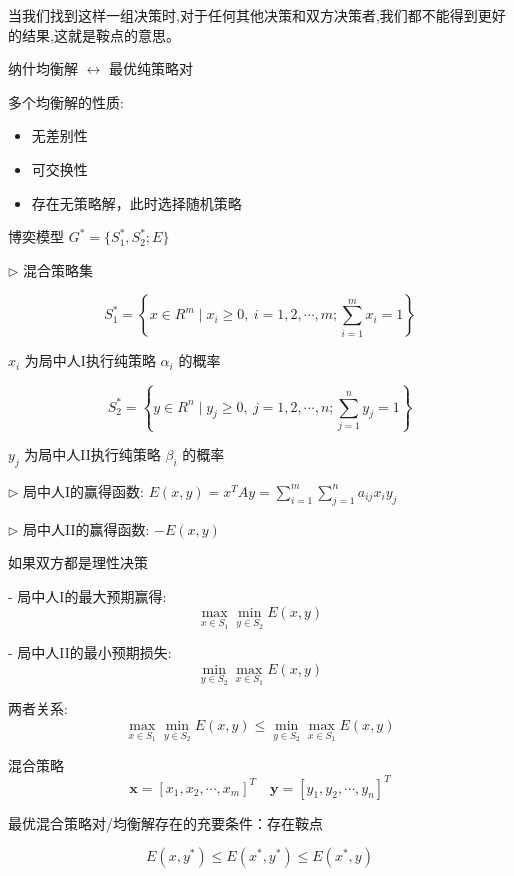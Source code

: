 \documentclass[12pt, a4paper, oneside, UTF8]{ctexbook}
\begin{document}
当我们找到这样一组决策时,对于任何其他决策和双方决策者,我们都不能得到更好的结果,这就是鞍点的意思。

\begin{remark}
    纳什均衡解 $\leftrightarrow$ 最优纯策略对
\end{remark}

多个均衡解的性质:
\begin{itemize}
    \item 无差别性
    \item 可交换性
    \item 存在无策略解，此时选择随机策略
\end{itemize}

\begin{definition}
    博奕模型 $G^* = \{S_1^*, S_2^*; E\}$

    $\triangleright$ 混合策略集

    $$ S_1^* = \left\{ x \in R^m \mid x_i \geq 0, \ i = 1, 2, \cdots, m; \sum_{i=1}^m x_i = 1 \right\} $$

    $x_i$ 为局中人I执行纯策略 $\alpha_i$ 的概率

    $$ S_2^* = \left\{ y \in R^n \mid y_j \geq 0, \ j = 1, 2, \cdots, n; \sum_{j=1}^n y_j = 1 \right\} $$

    $y_j$ 为局中人II执行纯策略 $\beta_i$ 的概率

    $\triangleright$ 局中人I的赢得函数: $E(x, y) = x^T A y = \sum_{i=1}^m \sum_{j=1}^n a_{ij} x_i y_j$

    $\triangleright$ 局中人II的赢得函数: $-E(x, y)$
\end{definition}

如果双方都是理性决策

- 局中人I的最大预期赢得:
  $$
  \max_{x \in S_1} \min_{y \in S_2} E(x, y)
  $$

- 局中人II的最小预期损失:
  $$
  \min_{y \in S_2} \max_{x \in S_1} E(x, y)
  $$

两者关系:
$$
\max_{x \in S_1} \min_{y \in S_2} E(x, y) \leq \min_{y \in S_2} \max_{x \in S_1} E(x, y)
$$

混合策略
$$
\mathbf{x} = [x_1, x_2, \cdots, x_m]^T \quad \mathbf{y} = [y_1, y_2, \cdots, y_n]^T
$$

\begin{theorem}
    最优混合策略对/均衡解存在的充要条件：存在鞍点
    
    $$E(x, y^*) \leq E(x^*, y^*) \leq E(x^*, y)$$
\end{theorem}
\end{document}
